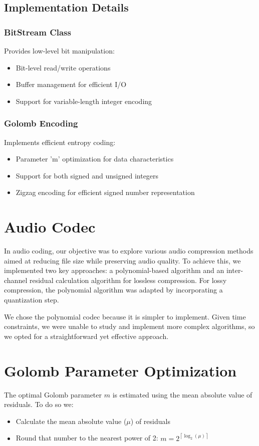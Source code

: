 \documentclass[a4paper,14pt]{article}
\begin{document}
\subsection{Implementation Details}

\subsubsection{BitStream Class}
Provides low-level bit manipulation:
\begin{itemize}
    \item Bit-level read/write operations
    \item Buffer management for efficient I/O
    \item Support for variable-length integer encoding
\end{itemize}

\subsubsection{Golomb Encoding}
Implements efficient entropy coding:
\begin{itemize}
    \item Parameter 'm' optimization for data characteristics
    \item Support for both signed and unsigned integers
    \item Zigzag encoding for efficient signed number representation
\end{itemize}

\section{Audio Codec}
In audio coding, our objective was to explore various audio compression methods aimed at reducing file size while preserving audio quality. To achieve this, we implemented two key approaches: a polynomial-based algorithm and an inter-channel residual calculation algorithm for lossless compression. For lossy compression, the polynomial algorithm was adapted by incorporating a quantization step.

We chose the polynomial codec because it is simpler to implement. Given time constraints, we were unable to study and implement more complex algorithms, so we opted for a straightforward yet effective approach.

\section{Golomb Parameter Optimization}
The optimal Golomb parameter $m$ is estimated using the mean absolute value of residuals.
To do so we:
    \begin{itemize}
        \item Calculate the mean absolute value ($\mu$) of residuals
        \item Round that number to the nearest power of 2: $ m = 2^{\left\lceil {\log_2(\mu)} \right\rceil}$
    \end{itemize}
\end{document}
